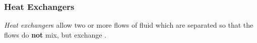 \subsubsection{Heat Exchangers}\label{subsubsec:Heat_Exchangers}
\begin{definition}\label{def:Heat_Exchanger}
  \emph{Heat exchanger}s allow two or more flows of fluid which are separated so that the flows do \textbf{not} mix, but exchange .
\end{definition}

